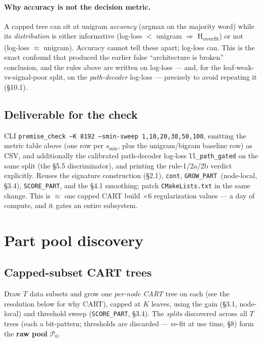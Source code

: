 \documentclass[11pt]{article}
\newcommand{\code}[1]{\texttt{#1}}
\newcommand{\cont}{\code{cont}}
\newcommand{\score}{\code{SCORE\_PART}}
\newcommand{\grow}{\code{GROW\_PART}}
\begin{document}
\paragraph{Why accuracy is not the decision metric.} A capped tree can sit at unigram \emph{accuracy} (argmax on the majority word) while its \emph{distribution} is either informative (log-loss $<$ unigram $\Rightarrow$ H\textsubscript{overfit}) or not (log-loss $\approx$ unigram). Accuracy cannot tell these apart; log-loss can. This is the exact confound that produced the earlier false ``architecture is broken'' conclusion, and the rules above are written on log-loss --- and, for the leaf-weak-vs-signal-poor split, on the \emph{path-decoder} log-loss --- precisely to avoid repeating it (\S10.1).


\subsection{Deliverable for the check}
CLI \code{premise\_check --K 8192 --smin-sweep 1,10,20,30,50,100}, emitting the metric table above (one row per $s_{\min}$, plus the unigram/bigram baseline row) as CSV, and additionally the calibrated path-decoder log-loss \code{ll\_path\_gated} on the same split (the \S5.5 discriminator), and printing the rule-1/2a/2b verdict explicitly. Reuses the signature construction (\S2.1), \cont, \grow\ (node-local, \S3.4), \score, and the \S4.1 smoothing; patch \code{CMakeLists.txt} in the same change. This is $\approx$ one capped CART build $\times 6$ regularization values --- a day of compute, and it gates an entire subsystem.


\section{Part pool discovery}

\subsection{Capped-subset CART trees}
Draw $T$ data subsets and grow one \emph{per-node CART} tree on each (see the resolution below for why CART), capped at $K$ leaves, using the gain (\S3.1, node-local) and threshold sweep (\score, \S3.4). The \emph{splits} discovered across all $T$ trees (each a bit-pattern; thresholds are discarded --- re-fit at use time, \S8) form the \textbf{raw pool} $\mathcal{P}_0$.
\end{document}
